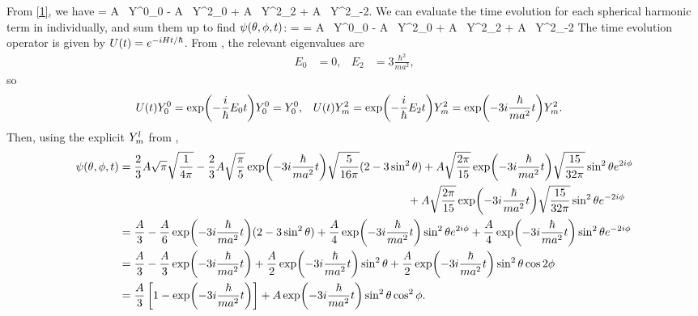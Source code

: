 \begin{solution}
	From \ref{1}, we have
	\beqn \label{expand}
		\psitpo =  A \sqrt{\pi} \, Y^0_0 -  A  \, Y^2_0 + A  \, Y^2_2 + A  \, Y^2_{-2}.
	\eeqn
	We can evaluate the time evolution for each spherical harmonic term in  individually, and sum them up to find $\psi(\theta, \phi, t)$:
	\beq
		\psitpt = \Ut \psitpo =  A \sqrt{\pi} \, \Ut Y^0_0 -  A  \, \Ut Y^2_0 + A  \, \Ut Y^2_2 + A  \, \Ut Y^2_{-2}
	\eeq
	  The time evolution operator is given by $U(t) = e^{-i H t / \hbar}$.  From , the relevant eigenvalues are
	\begin{align*}
		E_0 &= 0, &
		E_2 &= 3 \frac{\hbar^2}{m a^2},
	\end{align*}
	so
	\begin{align*}
		U(t) Y^0_0 &= \exp(-\frac{i}{\hbar} E_0 t) Y^0_0 = Y^0_0, &
		U(t) Y^2_m &= \exp(-\frac{i}{\hbar} E_2 t) Y^2_m = \exp(-3 i \frac{\hbar}{m a^2} t) Y^2_m.
	\end{align*}
	Then, using the explicit $Y^l_m$ from ,
	\begin{align}
		\psi(\theta, \phi, t) &= \frac{2}{3} A \sqrt{\pi} \sqrt{\frac{1}{4 \pi}} - \frac{2}{3} A \sqrt{\frac{\pi}{5}} \exp(-3 i \frac{\hbar}{m a^2} t) \sqrt{\frac{5}{16 \pi}} (2 - 3 \sin^2{\theta}) + A \sqrt{\frac{2\pi}{15}} \exp(-3 i \frac{\hbar}{m a^2} t) \sqrt{\frac{15}{32 \pi}} \sin^2{\theta} e^{2 i \phi} \notag \\
		&\phantom{mmmmmmmmmmmmmmmmmmmmmmmmmmmmm} + A \sqrt{\frac{2\pi}{15}} \exp(-3 i \frac{\hbar}{m a^2} t) \sqrt{\frac{15}{32 \pi}} \sin^2{\theta} e^{-2 i \phi} \notag \\
		&= \frac{A}{3} - \frac{A}{6} \exp(-3 i \frac{\hbar}{m a^2} t) (2 - 3 \sin^2{\theta}) + \frac{A}{4} \exp(-3 i \frac{\hbar}{m a^2} t) \sin^2{\theta} e^{2 i \phi} + \frac{A}{4} \exp(-3 i \frac{\hbar}{m a^2} t) \sin^2{\theta} e^{-2 i \phi} \notag \\
		&= \frac{A}{3} - \frac{A}{3} \exp(-3 i \frac{\hbar}{m a^2} t) + \frac{A}{2} \exp(-3 i \frac{\hbar}{m a^2} t) \sin^2{\theta} + \frac{A}{2} \exp(-3 i \frac{\hbar}{m a^2} t) \sin^2{\theta} \cos{2\phi} \notag \\
		&= \frac{A}{3} \left[ 1 - \exp(-3 i \frac{\hbar}{m a^2} t) \right] + A \exp(-3 i \frac{\hbar}{m a^2} t) \sin^2{\theta} \cos^2{\phi}. \label{psitpt}
	\end{align}
\end{solution}

\newcommand{\Li}{L_i}
\newcommand{\Lx}{L_x}
\newcommand{\Ly}{L_y}
\newcommand{\Lz}{L_z}

